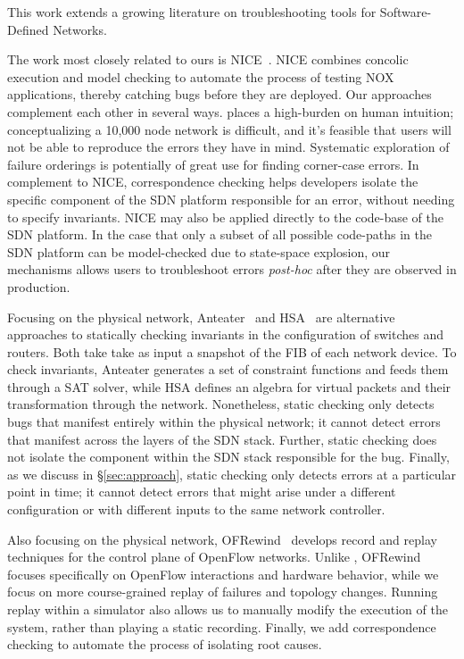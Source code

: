 This work extends a growing literature on troubleshooting tools for
Software-Defined Networks.
    
The work most closely related to ours is NICE~\cite{nice}. NICE combines concolic execution
and model checking to automate the process of testing NOX applications,
thereby catching bugs before
they are deployed. Our approaches complement each other in several ways. 
\Simulator{} places a high-burden on human intuition; conceptualizing
a 10,000 node network is difficult, and it's feasible that users will not be able 
to reproduce the errors they have in mind. Systematic exploration of failure orderings 
is potentially of great use for finding corner-case errors.
In complement to NICE, correspondence checking helps developers isolate the
specific component of the SDN platform responsible for an error, without needing to specify invariants.
NICE may also be applied directly to the code-base of the SDN platform. In the case that only a subset
of all possible code-paths in the SDN platform can be model-checked due to state-space explosion, 
our mechanisms allows users to troubleshoot errors 
{\it post-hoc} after they are observed in production.

Focusing on the physical network, Anteater~\cite{anteater} and HSA~\cite{hsa}
are alternative approaches to statically checking invariants in the
configuration of switches and routers. Both take take as input a snapshot of
the FIB of each network device. To check invariants, Anteater generates a set of constraint functions and feeds them through a SAT
solver, while HSA defines an algebra for virtual packets and
their transformation through the network. Nonetheless, static checking
only detects bugs that manifest entirely within the physical network;  
it cannot detect errors that manifest across the layers of the SDN stack. Further,
static checking does not isolate the component within the SDN stack
responsible for the bug. Finally, as we discuss in \S\ref{sec:approach},
static checking only detects errors at a particular point in time; it cannot 
detect errors that might arise under a different configuration or with different
inputs to the same network controller.

Also focusing on the physical network, OFRewind~\cite{ofrewind} develops
record and replay techniques for the control plane of OpenFlow networks.
Unlike \simulator, OFRewind focuses specifically on OpenFlow
interactions and hardware behavior, while we focus on more course-grained replay of
failures and topology changes. Running replay within a simulator also allows
us to manually modify the execution of the system, rather than playing a
static recording. Finally, we add correspondence checking to automate the
process of isolating root causes.

